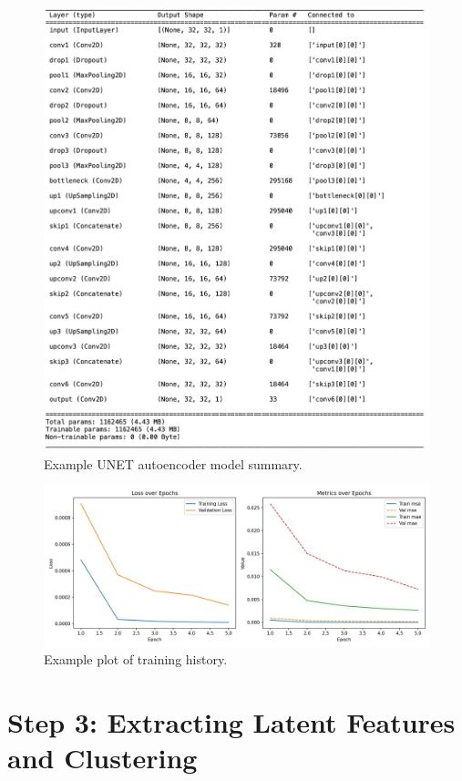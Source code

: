 \documentclass[11pt]{article}
\begin{document}
\begin{figure}[H]
\centering
\includegraphics[width=\textwidth]{figs/autoencoder_summary}
\caption{Example UNET autoencoder model summary.}
\end{figure}

\begin{figure}[H]
\centering
\includegraphics[width=\textwidth]{figs/unet_history}
\caption{Example plot of training history.}
\end{figure}




\section*{Step 3: Extracting Latent Features and Clustering}
\end{document}
